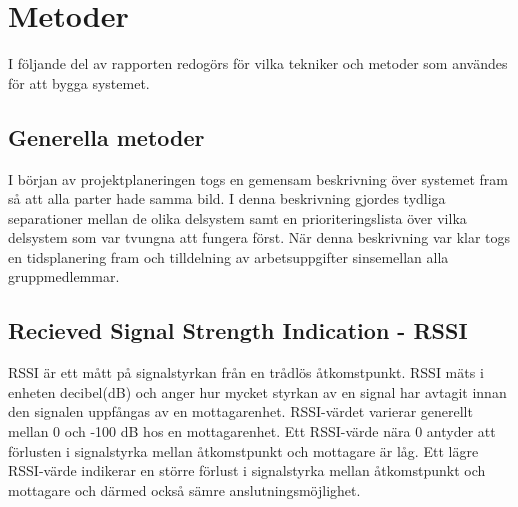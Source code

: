 \documentclass[swedish, a4paper,12pt]{article}
\begin{document}


\section{Metoder}




I följande del av rapporten redogörs för vilka tekniker och metoder som användes för att bygga systemet.

\subsection{Generella metoder}
I början av projektplaneringen togs en gemensam beskrivning över systemet fram så att alla parter hade samma bild. I denna beskrivning gjordes tydliga separationer mellan de olika delsystem samt en prioriteringslista över vilka delsystem som var tvungna att fungera först. När denna beskrivning var klar togs en tidsplanering fram och tilldelning av arbetsuppgifter sinsemellan alla gruppmedlemmar.

\subsection{Recieved Signal Strength Indication - RSSI}\label{RSSI}
RSSI är ett mått på signalstyrkan från en trådlös åtkomstpunkt. RSSI mäts i enheten decibel(dB) och anger hur mycket styrkan av en signal har avtagit innan den signalen uppfångas av en mottagarenhet. RSSI-värdet varierar generellt mellan 0 och -100 dB hos en mottagarenhet. Ett RSSI-värde nära 0 antyder att förlusten i signalstyrka mellan åtkomstpunkt och mottagare är låg. Ett lägre RSSI-värde indikerar en större förlust i signalstyrka mellan åtkomstpunkt och mottagare och därmed också sämre anslutningsmöjlighet.
\end{document}
